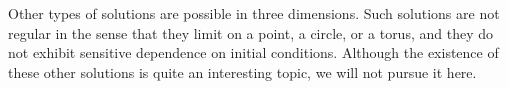 \documentclass{ximera}
\begin{document}
Other types of solutions are possible in three dimensions.  Such solutions
are not regular in the sense that they limit on a point, a circle, or a
torus, and they do not exhibit sensitive dependence on initial conditions.  
Although the existence of these other solutions is quite an interesting
topic, we will not pursue it here. 




\end{document}
